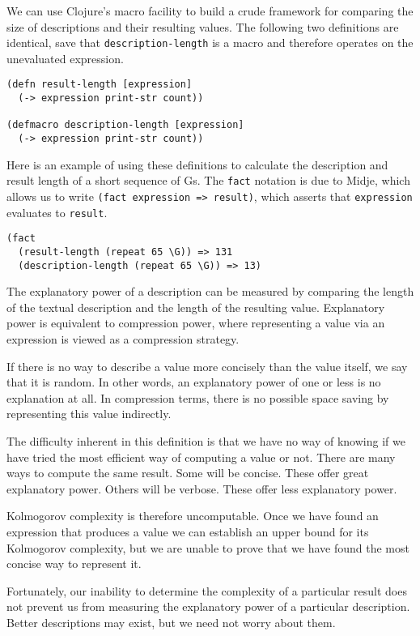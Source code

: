 \documentclass[numbers]{sigplanconf}
\begin{document}
We can use Clojure's macro facility to build a crude framework for comparing the size of descriptions and their
resulting values. The following two definitions are identical, save that \verb|description-length| is a macro and therefore
operates on the unevaluated expression.

\begin{verbatim}
(defn result-length [expression]
  (-> expression print-str count))

(defmacro description-length [expression]
  (-> expression print-str count))
\end{verbatim}

Here is an example of using these definitions to calculate the description and result length of a short sequence of Gs.
The \verb|fact| notation is due to Midje, which allows us to write \verb|(fact expression => result)|,
which asserts that \verb|expression| evaluates to \verb|result|.

\begin{verbatim}
(fact
  (result-length (repeat 65 \G)) => 131
  (description-length (repeat 65 \G)) => 13)
\end{verbatim}

The explanatory power of a description can be measured by comparing the length of the textual description and the length
of the resulting value. Explanatory power is equivalent to compression power, where representing a value via an
expression is viewed as a compression strategy.

If there is no way to describe a value more concisely than the value itself, we say that it is random. In other words, an
explanatory power of one or less is no explanation at all. In compression terms, there is no possible space saving
by representing this value indirectly.

The difficulty inherent in this definition is that we have no way of knowing if we have tried the most efficient way of
computing a value or not. There are many ways to compute the same result. Some will be concise. These offer great
explanatory power. Others will be verbose. These offer less explanatory power.

Kolmogorov complexity is therefore uncomputable. Once we have found an expression that produces a value we can establish
an upper bound for its Kolmogorov complexity, but we are unable to prove that we have found the most concise way to
represent it.

Fortunately, our inability to determine the complexity of a particular result does not prevent us from measuring the
explanatory power of a particular description. Better descriptions may exist, but we need not worry about them.
\end{document}

